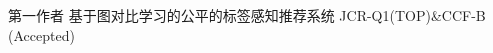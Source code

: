 \begin{cventries}
\cventry
  {第一作者} %
  {基于图对比学习的公平的标签感知推荐系统} %
  {JCR-Q1(TOP)\&CCF-B (Accepted)} %

\end{cventries}
